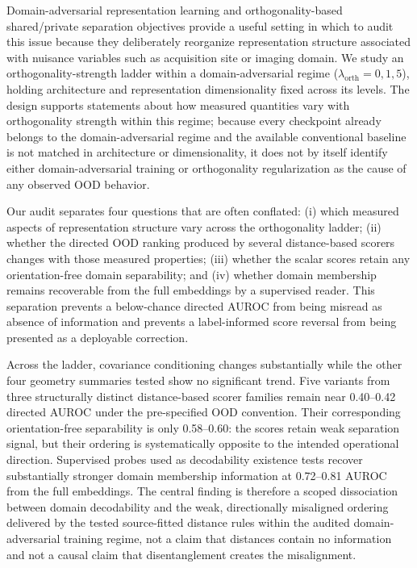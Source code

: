 Domain-adversarial representation learning \citep{ganin2015unsupervised, ganin2016domain} and orthogonality-based shared/private separation objectives \citep{bousmalis2016domain} provide a useful setting in which to audit this issue because they deliberately reorganize representation structure associated with nuisance variables such as acquisition site or imaging domain. We study an orthogonality-strength ladder within a domain-adversarial regime ($\lambda_{\mathrm{orth}}=0,1,5$), holding architecture and representation dimensionality fixed across its levels. The design supports statements about how measured quantities vary with orthogonality strength within this regime; because every checkpoint already belongs to the domain-adversarial regime and the available conventional baseline is not matched in architecture or dimensionality, it does not by itself identify either domain-adversarial training or orthogonality regularization as the cause of any observed OOD behavior.

Our audit separates four questions that are often conflated: (i) which measured aspects of representation structure vary across the orthogonality ladder; (ii) whether the directed OOD ranking produced by several distance-based scorers changes with those measured properties; (iii) whether the scalar scores retain any orientation-free domain separability; and (iv) whether domain membership remains recoverable from the full embeddings by a supervised reader. This separation prevents a below-chance directed AUROC from being misread as absence of information and prevents a label-informed score reversal from being presented as a deployable correction.

Across the ladder, covariance conditioning changes substantially while the other four geometry summaries tested show no significant trend. Five variants from three structurally distinct distance-based scorer families remain near 0.40--0.42 directed AUROC under the pre-specified OOD convention. Their corresponding orientation-free separability is only 0.58--0.60: the scores retain weak separation signal, but their ordering is systematically opposite to the intended operational direction. Supervised probes used as decodability existence tests recover substantially stronger domain membership information at 0.72--0.81 AUROC from the full embeddings. The central finding is therefore a scoped dissociation between domain decodability and the weak, directionally misaligned ordering delivered by the tested source-fitted distance rules within the audited domain-adversarial training regime, not a claim that distances contain no information and not a causal claim that disentanglement creates the misalignment.

